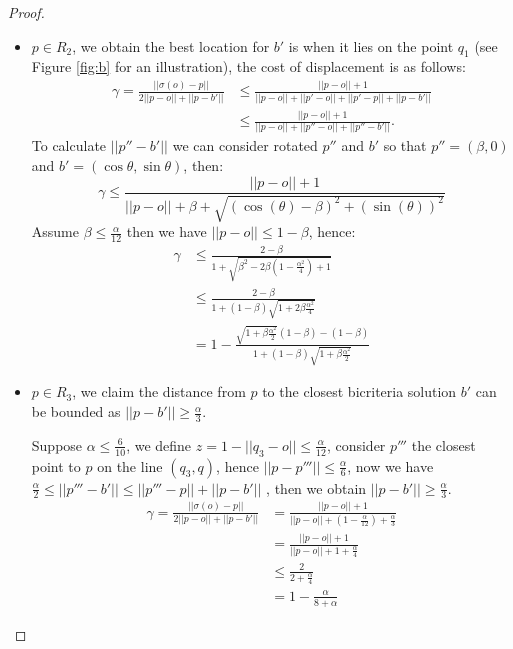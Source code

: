 \documentclass[11pt]{article}
\begin{document}
\begin{proof}
\begin{itemize}
 \item $p \in R_2$, we obtain the best location for $b'$ is when it lies on the point $q_1$ (see Figure \ref{fig:b} for an illustration), the cost of displacement is as follows:
    \begin{equation*}
     \begin{split}
        \gamma= \frac{||\sigma(o)-p||}{2||p-o|| + ||p-b'||} &\leq \frac{||p-o||+1}{||p-o|| + ||p'-o||+||p'-p||+||p-b'||}\\
        &\leq \frac{||p-o||+1}{||p-o||+ ||p''-o||+||p''-b'||}.
    \end{split}
    \end{equation*}
  To calculate $||p''-b'||$ we can consider  rotated $p''$ and $b'$ so that $p''=(\beta , 0)$ and $b'= (\cos\theta, \sin\theta)$, then:
    \begin{equation*}
       \gamma \leq \frac{||p-o|| +1}{||p-o|| + \beta + \sqrt{( \cos(\theta) - \beta)^2+(\sin(\theta))^2}}
    \end{equation*}
 Assume $\beta \leq \frac{\alpha}{12}$ then we have  $||p-o|| \leq 1-\beta$, hence:
    \begin{equation*}
        \begin{split}
         \gamma&\leq  \frac{2-\beta}{1+  \sqrt{\beta^2-2\beta(1-\frac{\alpha^2}{4})+1}}\\
        &\leq  \frac{2-\beta}{1 + (1-\beta)\sqrt{1+2\beta\frac{\alpha^2}{4}}}\\
        &=1-\frac{\sqrt{1+\beta\frac{\alpha^2}{2}}(1-\beta)-(1-\beta)}{1 + (1-\beta)\sqrt{1+\beta\frac{\alpha^2}{2}}}
        \end{split}
    \end{equation*}




    \item $p\in R_3$, we claim  the distance from $p$ to the closest bicriteria solution $b'$ can be bounded as $||p-b'|| \geq \frac{\alpha}{3}$.
    
    Suppose $\alpha\leq \frac{6}{10}$,  we define $z = 1 - ||q_3 - o|| \leq\frac{\alpha}{12}$, consider $p'''$ the closest point to $p$ on the line $(q_3, q)$,  hence $||p-p'''|| \leq \frac{\alpha}{6}$, now we have $\frac{\alpha}{2} \leq ||p'''-b'|| \leq ||p'''-p||+||p-b'||$ , then we obtain $||p-b'|| \geq \frac{\alpha}{3}$.
    \begin{equation*}
     \begin{split}
        \gamma= \frac{||\sigma(o)-p||}{2||p-o|| + ||p-b'||} & = \frac{||p-o||+1}{||p-o|| + (1- \frac{\alpha}{12})+ \frac{\alpha}{3}}\\
        &= \frac{||p-o|| +1}{||p-o|| + 1+ \frac{\alpha}{4}}\\
        &\leq \frac{2}{2+\frac{\alpha}{4}}\\
        &=1-\frac{\alpha}{8+\alpha}
     \end{split}
    \end{equation*}


\end{itemize}
\end{proof}
\end{document}
